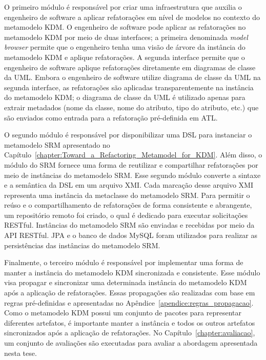 O primeiro módulo é responsável por criar uma infraestrutura que auxilia o engenheiro de software a aplicar refatorações em nível de modelos no contexto do metamodelo KDM. O engenheiro de software pode aplicar as refatorações no metamodelo KDM por meio de duas interfaces; a primeira denominada \textit{model browser} permite que o engenheiro tenha uma visão de árvore da instância do metamodelo KDM e aplique refatorações. A segunda interface permite que o engenheiro de software aplique refatorações diretamente em diagramas de classe da UML. Embora o engenheiro de software utilize diagrama de classe da UML na segunda interface, as refatorações são aplicadas transparentemente na instância do metamodelo KDM; o diagrama de classe da UML é utilizado apenas para extrair metadados (nome da classe, nome do atributo, tipo do atributo, etc.) que são enviados como entrada para a refatoração pré-definida em ATL.

O segundo módulo é responsável por disponibilizar uma DSL para instanciar o metamodelo SRM apresentado no Capítulo~\ref{chapter:Toward_a_Refactoring_Metamodel_for_KDM}. Além disso, o módulo do SRM fornece uma forma de reutilizar e compartilhar refatorações por meio de instâncias do metamodelo SRM. Esse segundo módulo converte a sintaxe e a semântica da DSL em um arquivo XMI. Cada marcação desse arquivo XMI representa uma instância da metaclasse do metamodelo SRM. Para permitir o reúso e o compartilhamento de refatorações de forma consistente e abrangente, um repositório remoto foi criado, o qual é dedicado para executar solicitações RESTful. Instâncias do metamodelo SRM são enviadas e recebidas por meio da API RESTful. JPA e o banco de dados MySQL foram utilizados para realizar as persistências das instâncias do metamodelo SRM.

Finalmente, o terceiro módulo é responsável por implementar uma forma de manter a instância do metamodelo KDM sincronizada e consistente. Esse módulo visa propagar e sincronizar uma determinada instância do metamodelo KDM após a aplicação de refatorações. Essas propagações são realizadas com base em regras pré-definidas e apresentadas no Apêndice~\ref{apendice:regras_propagacao}. Como o metamodelo KDM possui um conjunto de pacotes para representar diferentes artefatos, é importante manter a instância e todos os outros artefatos sincronizados após a aplicação de refatorações. No Capítulo~\ref{chapter:avaliacao}, um conjunto de avaliações são executadas para avaliar a abordagem apresentada nesta tese.
